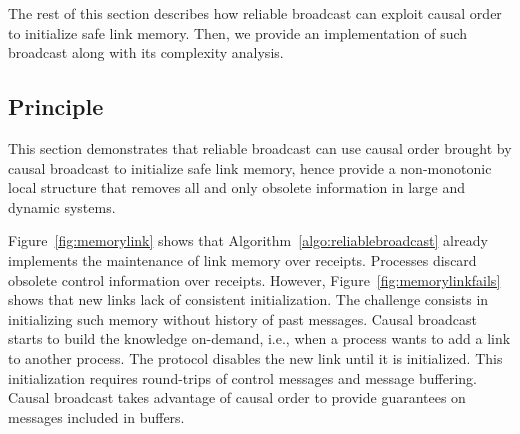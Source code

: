 %     

The rest of this section describes how reliable broadcast can exploit causal
order to initialize safe link memory. Then, we provide an implementation of such
broadcast along with its complexity analysis.

\subsection{Principle}

This section demonstrates that reliable broadcast can use causal order brought
by causal broadcast to initialize safe link memory, hence provide a
non-monotonic local structure that removes all and only obsolete information in
large and dynamic systems.

Figure~\ref{fig:memorylink} shows that Algorithm~\ref{algo:reliablebroadcast}
already implements the maintenance of link memory over receipts. Processes
discard obsolete control information over receipts.  However,
Figure~\ref{fig:memorylinkfails} shows that new links lack of consistent
initialization. The challenge consists in initializing such memory without
history of past messages. Causal broadcast starts to build the knowledge
on-demand, i.e., when a process wants to add a link to another process.  The
protocol disables the new link until it is initialized. This initialization
requires round-trips of control messages and message buffering.  Causal
broadcast takes advantage of causal order to provide guarantees on messages
included in buffers.

%     

